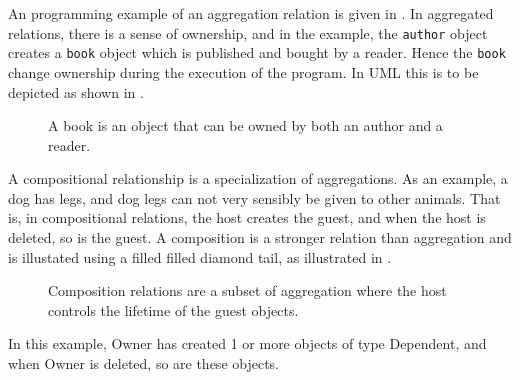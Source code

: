 \documentclass[fsharpNotes.tex]{subfiles}
\begin{document}
An programming example of an aggregation relation is given in .
% 
% 
In aggregated relations, there is a sense of ownership, and in the example, the \lstinline{author} object creates a \lstinline{book} object which is published and bought by a reader. Hence the \lstinline{book} change ownership during the execution of the program. In UML this is to be depicted as shown in .
\begin{figure}
  \centering
  \caption{A book is an object that can be owned by both an author and a reader.}
  \label{fig:umlAggregationUML}
\end{figure}

A compositional relationship is a specialization of aggregations. As an example, a dog has legs, and dog legs can not very sensibly be given to other animals. That is, in compositional relations, the host creates the guest, and when the host is deleted, so is the guest.  A composition is a stronger relation than aggregation and is illustated using a filled filled diamond tail, as illustrated in .
\begin{figure}
  \centering
  \caption{Composition relations are a subset of aggregation where the host controls the lifetime of the guest objects.}
  \label{fig:composition}
\end{figure}
In this example, Owner has created 1 or more objects of type Dependent, and when Owner is deleted, so are these objects.
\end{document}
